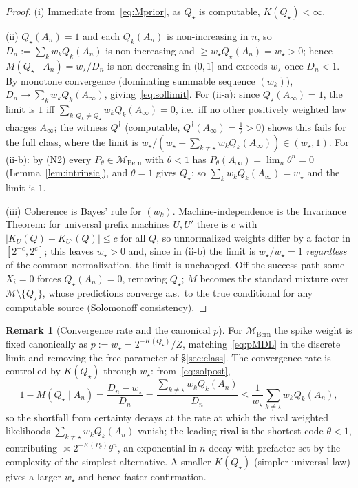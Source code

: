 \documentclass{amsart}
\theoremstyle{definition}
\newtheorem{remark}{Remark}
\begin{document}
\begin{proof}
(i) Immediate from~\eqref{eq:Mprior}, as $Q_\star$ is computable, $K(Q_\star)<\infty$.

(ii) $Q_\star(A_n)=1$ and each $Q_k(A_n)$ is non-increasing in $n$, so
$D_n:=\sum_k w_k Q_k(A_n)$ is non-increasing and $\ge w_\star Q_\star(A_n)=w_\star>0$;
hence $M(Q_\star\mid A_n)=w_\star/D_n$ is non-decreasing in $(0,1]$ and exceeds
$w_\star$ once $D_n<1$. By monotone convergence (dominating summable sequence
$(w_k)$), $D_n\to\sum_k w_k Q_k(A_\infty)$, giving~\eqref{eq:sollimit}.
For (ii-a): since $Q_\star(A_\infty)=1$, the limit is $1$ iff
$\sum_{k:Q_k\ne Q_\star}w_k Q_k(A_\infty)=0$, i.e.\ iff no other positively
weighted law charges $A_\infty$; the witness $Q^{\dagger}$ (computable,
$Q^{\dagger}(A_\infty)=\tfrac12>0$) shows this fails for the full class, where the
limit is $w_\star/(w_\star+\sum_{k\ne\star}w_kQ_k(A_\infty))\in(w_\star,1)$.
For (ii-b): by (N2) every $P_\theta\in\mathcal M_{\mathrm{Bern}}$ with $\theta<1$
has $P_\theta(A_\infty)=\lim_n\theta^n=0$ (Lemma~\ref{lem:intrinsic}), and
$\theta=1$ gives $Q_\star$; so $\sum_k w_k Q_k(A_\infty)=w_\star$ and the limit
is $1$.

(iii) Coherence is Bayes' rule for $(w_k)$. Machine-independence is the Invariance
Theorem: for universal prefix machines $U,U'$ there is $c$ with
$|K_U(Q)-K_{U'}(Q)|\le c$ for all $Q$, so unnormalized weights differ by a factor
in $[2^{-c},2^{c}]$; this leaves $w_\star>0$ and, since in (ii-b) the limit is
$w_\star/w_\star=1$ \emph{regardless} of the common normalization, the limit is
unchanged. Off the success path some $X_i=0$ forces $Q_\star(A_n)=0$, removing
$Q_\star$; $M$ becomes the standard mixture over $\mathcal M\setminus\{Q_\star\}$,
whose predictions converge a.s.\ to the true conditional for any computable source
(Solomonoff consistency).
\end{proof}

\begin{remark}[Convergence rate and the canonical $p$]\label{rem:rate}
For $\mathcal M_{\mathrm{Bern}}$ the spike weight is fixed canonically as
$p:=w_\star=2^{-K(Q_\star)}/Z$, matching~\eqref{eq:pMDL} in the discrete limit and
removing the free parameter of \S\ref{sec:class}. The convergence rate is
controlled by $K(Q_\star)$ through $w_\star$: from~\eqref{eq:solpost},
\[
  1-M(Q_\star\mid A_n)=\frac{D_n-w_\star}{D_n}
  =\frac{\sum_{k\ne\star}w_kQ_k(A_n)}{D_n}
  \le \frac{1}{w_\star}\sum_{k\ne\star}w_kQ_k(A_n),
\]
so the shortfall from certainty decays at the rate at which the rival weighted
likelihoods $\sum_{k\ne\star}w_kQ_k(A_n)$ vanish; the leading rival is the
shortest-code $\theta<1$, contributing $\asymp 2^{-K(P_\theta)}\theta^n$, an
exponential-in-$n$ decay with prefactor set by the complexity of the simplest
alternative. A smaller $K(Q_\star)$ (simpler universal law) gives a larger
$w_\star$ and hence faster confirmation.
\end{remark}
\end{document}

